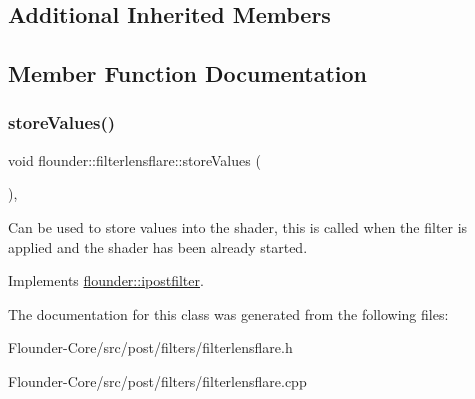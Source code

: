 \subsection*{Additional Inherited Members}


\subsection{Member Function Documentation}
\mbox{\label{classflounder_1_1filterlensflare_a2ab19cc2427e840c9ae11fc004e963be}} 
\subsubsection{\texorpdfstring{store\+Values()}{storeValues()}}
{\footnotesize\ttfamily void flounder\+::filterlensflare\+::store\+Values (\begin{DoxyParamCaption}{ }\end{DoxyParamCaption})\hspace{0.3cm}{\ttfamily [override]}, {\ttfamily [virtual]}}



Can be used to store values into the shader, this is called when the filter is applied and the shader has been already started. 



Implements \hyperlink{classflounder_1_1ipostfilter_a9b658b4672718d5ac36539875bde722e}{flounder\+::ipostfilter}.



The documentation for this class was generated from the following files\+:\begin{DoxyCompactItemize}
\item 
Flounder-\/\+Core/src/post/filters/filterlensflare.\+h\item 
Flounder-\/\+Core/src/post/filters/filterlensflare.\+cpp\end{DoxyCompactItemize}
